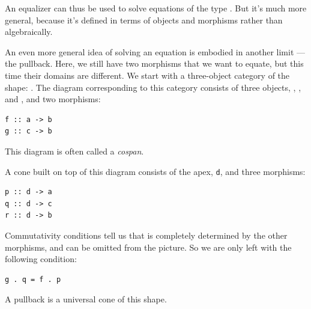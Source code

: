An equalizer can thus be used to solve equations of the type
. But it's much more general, because it's defined
in terms of objects and morphisms rather than algebraically.

An even more general idea of solving an equation is embodied in another
limit --- the pullback. Here, we still have two morphisms that we want
to equate, but this time their domains are different. We start with a
three-object category of the shape:
. The diagram corresponding to
this category consists of three objects, , , and
, and two morphisms:

\begin{verbatim}
f :: a -> b 
g :: c -> b
\end{verbatim}

This diagram is often called a \emph{cospan}.

A cone built on top of this diagram consists of the apex, \texttt{d},
and three morphisms:

\begin{verbatim}
p :: d -> a 
q :: d -> c 
r :: d -> b
\end{verbatim}

\begin{figure}[H]
    \centering
\end{figure}

Commutativity conditions tell us that  is completely
determined by the other morphisms, and can be omitted from the picture.
So we are only left with the following condition:

\begin{verbatim}
g . q = f . p
\end{verbatim}

A pullback is a universal cone of this shape.

\begin{figure}[H]
    \centering
\end{figure}

